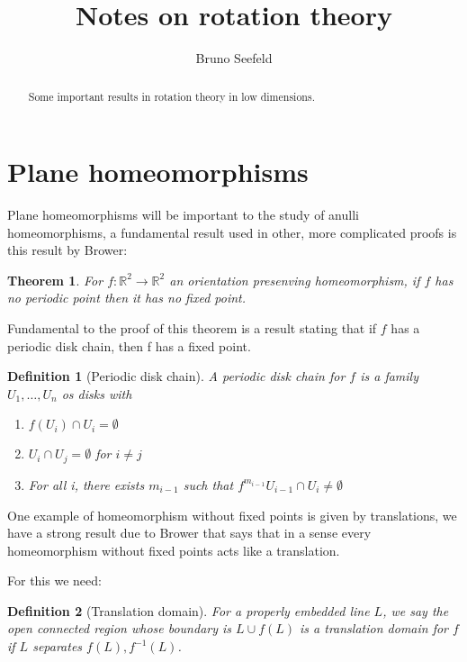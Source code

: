 \documentclass{article}
\title{Notes on rotation theory}
\author{Bruno Seefeld}
\newtheorem{theorem}{Theorem}[section]
\newtheorem{definition}{Definition}[section]
\begin{document}
\maketitle


\begin{abstract}
Some important results in rotation theory in low dimensions.
\end{abstract}



\section{Plane homeomorphisms}

Plane homeomorphisms will be important to the study of anulli homeomorphisms,
a fundamental result used in other, more complicated proofs is this result by
Brower:

\begin{theorem}
    For $f:\mathbb{R}^2\to \mathbb{R}^2$ an orientation presenving
    homeomorphism, if $f$ has no periodic point then it has no fixed point.

\end{theorem}


Fundamental to the proof of this theorem is a result stating that if 
$f$ has a periodic disk chain, then f has a fixed point.


\begin{definition}[Periodic disk chain]
A periodic disk chain for $f$ is a family $U_1,\ldots, U_n$ os disks with 
\begin{enumerate}
    \item $f(U_i)\cap U_i=\emptyset$
    \item $U_i\cap U_j=\emptyset$ for $i\neq j$
    \item For all i, there exists $m_{i-1}$ such that $f^{m_{i-1}}U_{i-1}\cap 
    U_i \neq \emptyset$
\end{enumerate}
\end{definition}



One example of homeomorphism without fixed points is given by translations,
we have a strong result due to Brower that says that in a sense every homeomorphism
without fixed points acts like a translation.

For this we need:

\begin{definition}[Translation domain]
For a properly embedded line $L$, we say the open connected region whose
boundary is $L\cup f(L)$ is a translation domain for $f$ if $L$ separates
$f(L),f^{-1}(L)$.

\end{definition}
\end{document}
